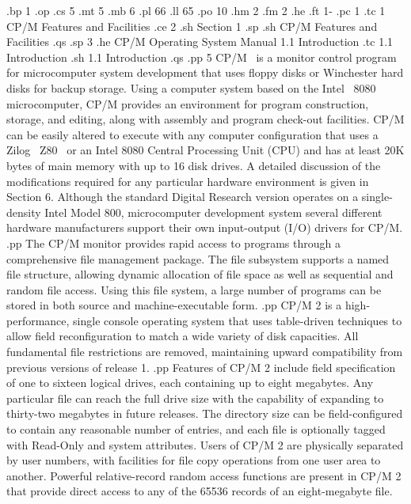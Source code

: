 .bp 1 
.op
.cs 5
.mt 5
.mb 6
.pl 66
.ll 65
.po 10
.hm 2
.fm 2
.he 
.ft                                 1-%
.pc 1
.tc 1  CP/M Features and Facilities
.ce 2
.sh
Section 1
.sp
.sh
CP/M Features and Facilities
.qs
.sp 3
.he CP/M Operating System Manual                    1.1  Introduction
.tc    1.1  Introduction
.sh
1.1  Introduction
.qs
.pp 5
CP/M \ is a monitor control program for microcomputer system development that 
uses floppy disks or Winchester hard disks for backup storage.  Using a 
computer system based on the Intel \ 8080 microcomputer, CP/M provides an 
environment for program construction, storage, and editing, along 
with assembly and program check-out facilities.  CP/M can be easily 
altered to execute with any computer 
configuration that uses a Zilog \ Z80 \ or an Intel 8080 Central Processing 
Unit (CPU) and has at least 20K bytes of main memory with up to 16 disk 
drives.  A detailed discussion of the modifications required for any 
particular hardware environment is given in Section 6.  Although the 
standard Digital Research version operates on a single-density 
Intel Model 800, microcomputer development system several different 
hardware manufacturers support their own input-output (I/O) drivers for CP/M.
.pp
The CP/M monitor provides rapid access to programs through a comprehensive 
file management package.  The file subsystem supports a named file structure, 
allowing dynamic allocation of file space as well as sequential and random 
file access.  Using this file system, a large number of programs can be 
stored in both source and machine-executable form.
.pp
CP/M 2 is a high-performance, single console operating system that uses 
table-driven techniques to allow field reconfiguration to match a wide 
variety of disk capacities.  All fundamental file restrictions are removed, 
maintaining upward compatibility from previous versions of release 1.  
.pp
Features of CP/M 2 include field specification of one to sixteen logical 
drives, each containing up to eight megabytes.  Any particular file can 
reach the full drive size with the capability of expanding to thirty-two 
megabytes in future releases.  The directory size can be field-configured to 
contain any reasonable number of entries, and each file is optionally tagged 
with Read-Only and system attributes.  Users of CP/M 2 are physically 
separated by user numbers, with facilities for file copy operations from one 
user area to another.  Powerful relative-record random access functions are 
present in CP/M 2 that provide direct access to any of the 65536 records of 
an eight-megabyte file.

